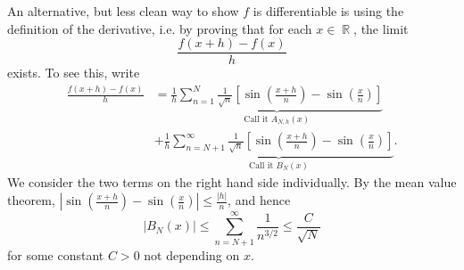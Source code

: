 \documentclass{exam}
\DeclareMathOperator{\RR}{\mathbb{R}}
\theoremstyle{problemstyle}
\newcommand{\1}[1]{\textbf{1}_{\left[#1\right]}} %
\begin{document}
\begin{questions}
\begin{parts}
\begin{solution}
		An alternative, but less clean way to show $f$ is differentiable is using the definition of the derivative, i.e. by proving that for each $x \in \RR$, the limit
		\[ \frac{f(x+h)-f(x)}{h} \]
		exists. To see this, write
    \begin{align}
          \label{eq:fall2015-0}
          \frac{f(x+h)-f(x)}{h} 
          &= \underbrace{\frac{1}{h} \sum_{n=1}^{N}
            \frac{1}{\sqrt{n}}\left[ \sin \left( \frac{x+h}{n} \right)
            - \sin \left( \frac{x}{n} \right)   \right]}_{\text{Call it }A_{N,h}(x)} \nonumber\\
            \quad&+ \underbrace{\frac{1}{h} \sum_{n=N+1}^{\infty}
            \frac{1}{\sqrt{n}}\left[ \sin \left( \frac{x+h}{n} \right)
            - \sin \left( \frac{x}{n} \right)   \right]}_{\text{Call it }B_{N}(x)}.
        \end{align}
        We consider the two terms on the right hand side individually. By the mean value theorem, $ \left|\sin \left( \frac{x+h}{n} \right)
        - \sin \left( \frac{x}{n} \right)\right|\leq \frac{|h|}{n}$, and hence
        \begin{equation}\label{eq:fall2015-1}
          |B_{N}(x)| \leq \sum_{n=N+1}^{\infty}\frac{1}{n^{3/2}} \leq \frac{C}{\sqrt{N}}
        \end{equation}
        for some constant $C>0$ not depending on $x$.
        

\end{solution}
\end{parts}
\end{questions}
\end{document}

